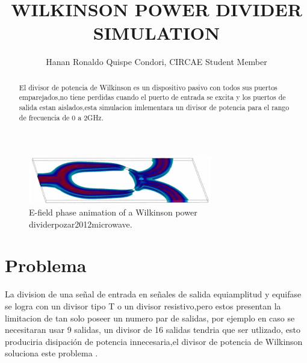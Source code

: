 \documentclass[a4paper]{IEEEtran} %
\begin{document}
\title{WILKINSON POWER DIVIDER SIMULATION}
\author{Hanan Ronaldo Quispe Condori, CIRCAE Student Member}
\maketitle
\begin{abstract}
El divisor de potencia de Wilkinson es un dispositivo pasivo con todos sus puertos emparejados,no tiene perdidas cuando el puerto de entrada se excita y los puertos de salida estan aislados,esta simulacion imlementara un divisor de potencia para el rango de frecuencia de 0 a 2GHz.
\end{abstract}
\begin{figure}[h]
    \centering
        \includegraphics[width=8cm]{imagenes/img2}
        \caption{E-field phase animation of a Wilkinson power dividerpozar2012microwave.}
        \label{fig:animation}
\end{figure}
\section{Problema}
\label{sec:Problem}
La division de una señal de entrada en señales de salida equiamplitud y equifase se logra con un divisor tipo T o un divisor resistivo,pero estos presentan la limitacion de tan solo poseer un numero par de salidas, por ejemplo en caso se necesitaran usar 9 salidas, un divisor de 16 salidas tendria que ser utlizado, esto produciria disipación de potencia innecesaria,el divisor de potencia de Wilkinson soluciona este problema \cite{wilkinson1960n}.
\end{document}
